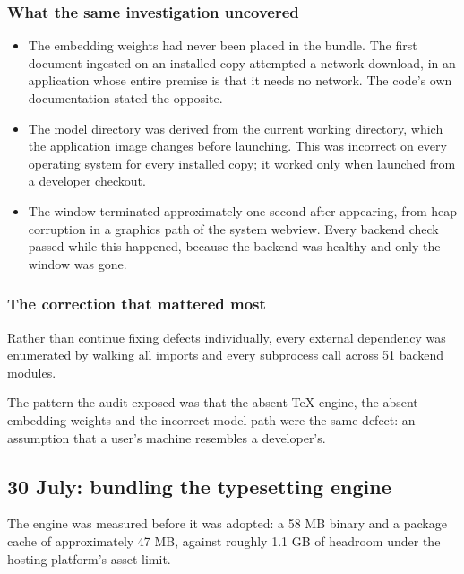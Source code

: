 \documentclass[11pt,a4paper]{article}
\begin{document}
\subsubsection{What the same investigation uncovered}

\begin{itemize}[leftmargin=*]
  \item The embedding weights had never been placed in the bundle. The first
        document ingested on an installed copy attempted a network download, in
        an application whose entire premise is that it needs no network. The
        code's own documentation stated the opposite.
  \item The model directory was derived from the current working directory,
        which the application image changes before launching. This was incorrect
        on every operating system for every installed copy; it worked only when
        launched from a developer checkout.
  \item The window terminated approximately one second after appearing, from
        heap corruption in a graphics path of the system webview. Every backend
        check passed while this happened, because the backend was healthy and
        only the window was gone.
\end{itemize}

\subsubsection{The correction that mattered most}

Rather than continue fixing defects individually, every external dependency was
enumerated by walking all imports and every subprocess call across 51 backend
modules.


The pattern the audit exposed was that the absent TeX engine, the absent
embedding weights and the incorrect model path were the same defect: an
assumption that a user's machine resembles a developer's.

\subsection{30 July: bundling the typesetting engine}

The engine was measured before it was adopted: a 58 MB binary and a package
cache of approximately 47 MB, against roughly 1.1 GB of headroom under the
hosting platform's asset limit.
\end{document}
